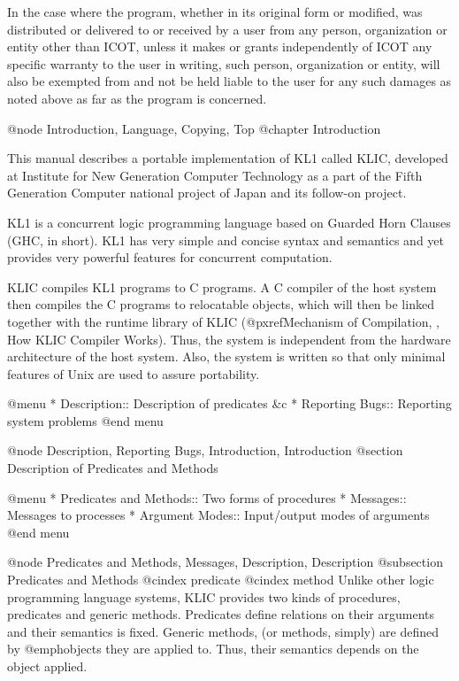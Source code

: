     In the case where the program, whether in its original form or
modified, was distributed or delivered to or received by a user from any
person, organization or entity other than ICOT, unless it makes or
grants independently of ICOT any specific warranty to the user in
writing, such person, organization or entity, will also be exempted from
and not be held liable to the user for any such damages as noted above
as far as the program is concerned.

@node Introduction, Language, Copying, Top
@chapter Introduction

This manual describes a portable implementation of KL1 called KLIC,
developed at Institute for New Generation Computer Technology as a part
of the Fifth Generation Computer national project of Japan and its
follow-on project.

KL1 is a concurrent logic programming language based on Guarded Horn
Clauses (GHC, in short).  KL1 has very simple and concise syntax and
semantics and yet provides very powerful features for concurrent
computation.

KLIC compiles KL1 programs to C programs.  A C compiler of the host
system then compiles the C programs to relocatable objects, which will
then be linked together with the runtime library of KLIC
(@pxref{Mechanism of Compilation, , How KLIC Compiler Works}).  Thus,
the system is independent from the hardware architecture of the host
system.  Also, the system is written so that only minimal features of
Unix are used to assure portability.

@menu
* Description::                 Description of predicates &c
* Reporting Bugs::              Reporting system problems
@end menu

@node Description, Reporting Bugs, Introduction, Introduction
@section Description of Predicates and Methods

@menu
* Predicates and Methods::      Two forms of procedures
* Messages::                    Messages to processes
* Argument Modes::              Input/output modes of arguments
@end menu

@node Predicates and Methods, Messages, Description, Description
@subsection Predicates and Methods
@cindex predicate
@cindex method
Unlike other logic programming language systems, KLIC provides two kinds
of procedures, predicates and generic methods.  Predicates define
relations on their arguments and their semantics is fixed.  Generic
methods, (or methods, simply) are defined by @emph{objects} they are
applied to.  Thus, their semantics depends on the object applied.

